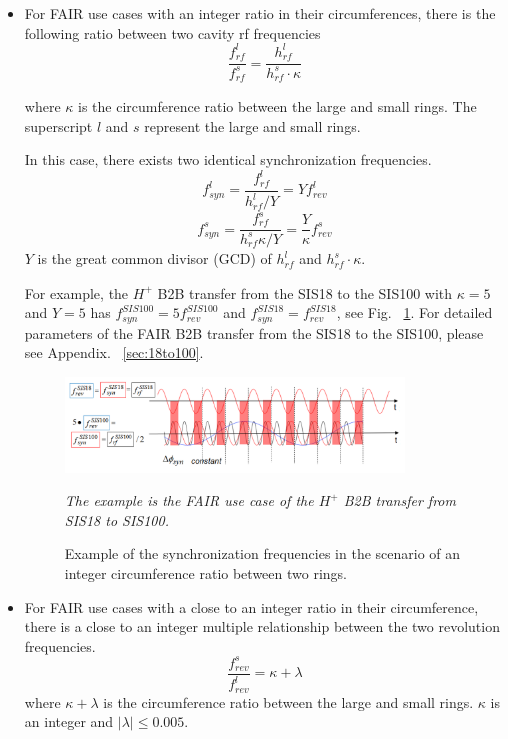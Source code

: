 \begin{itemize}
\item{
For FAIR use cases with an integer ratio in their circumferences, there is the following ratio between two cavity rf frequencies 
\begin{equation}
\frac{f_{\mathit{rf}}^{l}}{f_{\mathit{rf}}^{s}}= \frac{h^l_\mathit{rf}}{h^s_\mathit{rf} \cdot \kappa}\label{cir_int_1}
\end{equation}

where $ \kappa$ is the circumference ratio between the large and small rings. The superscript $l$ and $s$ represent the large and small rings.

In this case, there exists two identical synchronization frequencies. 
\begin{equation}
f_{\mathit{syn}}^{l}=\frac{f_{\mathit{rf}}^{l}}{h^l_\mathit{rf}/Y}=Y f_{\mathit{rev}}^{l} \label{synch_freq1_r}
\end{equation}
\begin{equation}
f_{\mathit{syn}}^{s}=\frac{f_{\mathit{rf}}^{s}}{h^s_\mathit{rf}\kappa/Y}=\frac{Y}{\kappa} f_{\mathit{rev}}^{s} \label{synch_freq2_r}
\end{equation}
$Y$ is the great common divisor (GCD) of $h^l_\mathit{rf}$ and $h^s_\mathit{rf} \cdot \kappa$.

For example, the $H^{+}$ B2B transfer from the SIS18 to the SIS100 with $\kappa=5$ and $Y=5$ has $f_{\mathit{syn}}^{SIS100}=5f_{\mathit{rev}}^{SIS100}$ and $f_{\mathit{syn}}^{SIS18}=f_{\mathit{rev}}^{SIS18}$, see Fig. ~\ref{USIS18}. For detailed parameters of the FAIR B2B transfer from the SIS18 to the SIS100, please see Appendix. ~\ref{sec:18to100}.
\begin{figure}[!htb]
   \centering   
   \includegraphics*[width=90mm]{USIS18.png}
   \caption{Example of the synchronization frequencies in the scenario of an integer circumference ratio between two rings.}
{\textsl{\small{The example is the FAIR use case of the $H^{+}$ B2B transfer from SIS18 to SIS100.}}}
   \label{USIS18}
\end{figure} 
}
\item 
{
For FAIR use cases with a close to an integer ratio in their circumference, there is a close to an integer multiple relationship between the two revolution frequencies. 
\begin{equation} 
\frac{f_{\mathit{rev}}^{s}}{f_{\mathit{rev}}^{l}}=\kappa+ \lambda
\end{equation}
where $ \kappa+\lambda$ is the circumference ratio between the large and small rings. $\kappa$ is an integer and $|\lambda|\le 0.005$.

}
\end{itemize}
